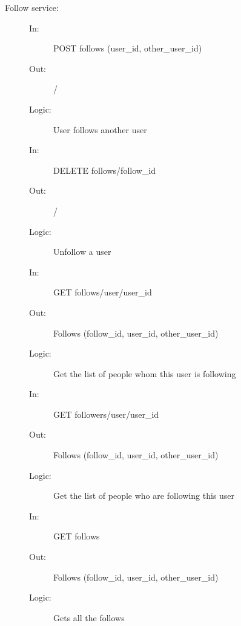 \documentclass{article}
\begin{document}
\begin{description}
    \item [Follow service:] 
    \begin{description}
        \item[]
        \item[In:] POST follows (user\_id, other\_user\_id)
        \item[Out:] /
        \item[Logic:] User follows another user
        \item[]
    \end{description}
    \begin{description}
        \item[In:] DELETE follows/follow\_id
        \item[Out:] /
        \item[Logic:] Unfollow a user
        \item[]
    \end{description}
    \begin{description}
        \item[In:] GET follows/user/user\_id
        \item[Out:] Follows (follow\_id, user\_id, other\_user\_id)
        \item[Logic:] Get the list of people whom this user is following
        \item[]
    \end{description}
        \begin{description}
        \item[In:] GET followers/user/user\_id
        \item[Out:] Follows (follow\_id, user\_id, other\_user\_id)
        \item[Logic:] Get the list of people who are following this user
        \item[]
    \end{description}
    \begin{description}
        \item[In:] GET follows
        \item[Out:] Follows (follow\_id, user\_id, other\_user\_id)
        \item[Logic:] Gets all the follows
    \end{description}
\end{description}
\end{document}
